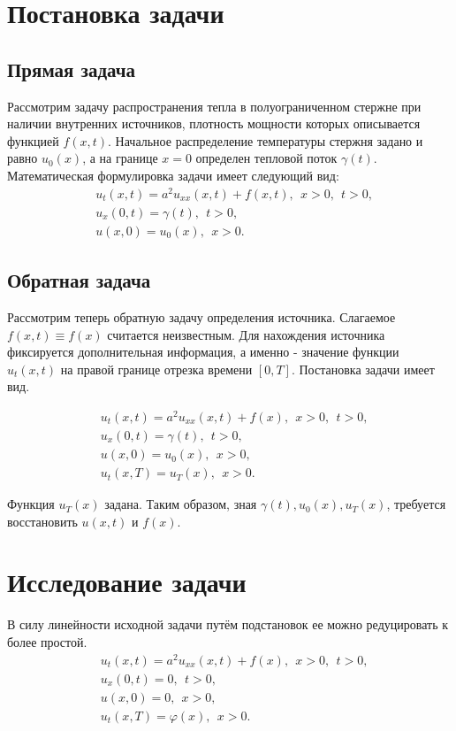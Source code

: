 \documentclass[12pt]{article} %
\begin{document}
\Large



\section{Постановка задачи}

\subsection{Прямая задача}
Рассмотрим задачу распространения тепла в полуограниченном стержне при наличии внутренних источников, плотность мощности которых описывается функцией $f(x, t)$. Начальное распределение температуры стержня задано и равно $u_0(x)$, а на границе $x = 0$ определен тепловой поток $\gamma(t)$. 
Математическая формулировка задачи имеет следующий вид:
\begin{align*}
        &u_t(x, t)= a^2u_{xx}(x, t) + f(x, t), \ \ x > 0, \ \ t > 0, \\
        &u_x(0, t) = \gamma(t), \ \ t > 0,\\
        &u(x, 0) = u_0(x), \ \ x >  0.
\end{align*}
\subsection{Обратная задача}

Рассмотрим теперь обратную задачу определения источника. Слагаемое $f(x,t) \equiv f(x)$ считается неизвестным. Для нахождения источника фиксируется дополнительная информация, а именно - значение функции $u_t(x, t)$ на правой границе отрезка времени $[0, T]$. Постановка задачи имеет вид.

\begin{align*}
        &u_t(x, t)= a^2u_{xx}(x, t) + f(x), \ \ x > 0, \ \ t > 0, \\
        &u_x(0, t) = \gamma(t), \ \ t > 0,\\
        &u(x, 0) = u_0(x), \ \ x > 0,\\
        &u_t(x, T) = u_T(x), \ \ x > 0.
\end{align*}

Функция $u_T(x)$ задана. Таким образом, зная $\gamma(t), u_0(x), u_T(x)$, требуется восстановить $u(x, t)$ и $f(x)$.
\section{Исследование задачи}
В силу линейности исходной задачи путём подстановок ее можно редуцировать к более простой.
\begin{align*}
        &u_t(x, t)= a^2u_{xx}(x, t) + f(x), \ \ x  > 0, \ \ t > 0, \\
        &u_x(0, t) = 0, \ \ t > 0,\\
        &u(x, 0) = 0, \ \ x > 0,\\
        &u_t(x, T) = \varphi(x), \ \ x > 0.
\end{align*}
\end{document}
